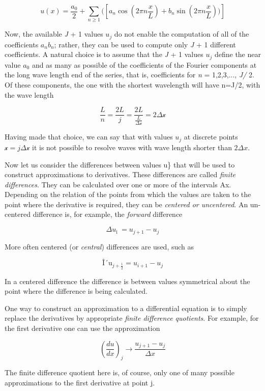 \[u( x ) = \frac{a_{0}}{2} + \sum_{n \geq 1}(\left[  a_{n}  \cos\left(2\pi n \frac{x}{L}\right)
+ b_{n}   \sin\left(2\pi n \frac{x}{L} \right))\right]\]

Now, the available \emph{J} + 1 values \(u_j\) do not enable the
computation of all of the coefficients \(a_{n}b_{n}\); rather, they can
be used to compute only \emph{J} + 1 different coefficients. A natural
choice is to assume that the \emph{J} + 1 values \(u_j\) define the near
value \(a_{0}\) and as many as possible of the coefficients of the
Fourier components at the long wave length end of the series, that is,
coefficients for \emph{n} = 1,2,3,..., \emph{J/} 2. Of these components,
the one with the shortest wavelength will have n=J/2, with the wave
length

\[\frac{L}{n} =  \frac{2L}{j} =  \frac{2L}{\frac{L}{\Delta\mathcal{x}}} = 2\Delta\mathcal{x}\]

Having made that choice, we can say that with values \(u_{j}\) at
discrete points \(\mathcal{x =}j\Delta\mathcal{x}\) it is not possible
to resolve waves with wave length shorter than $2 \Delta x$.

Now let us consider the differences between values u\} that will be used
to construct approximations to derivatives. These differences are
called \emph{finite differences}. They can be calculated over one or
more of the intervals Ax. Depending on the relation of the points from
which the values are taken to the point where the derivative is
required, they can be \emph{centered or uncentered}. An un-centered
difference is, for example, the \emph{forward} difference

\[\Delta u_{\text{i }} = u_{j + 1}  - u_{j}\]

More often centered (or \emph{central}) differences are used, such as

\[\text{Î´u}_{j + \frac{1}{2}} =  u_{i + 1} -  u_{j}\]

In a centered difference the difference is between values symmetrical
about the point where the difference is being calculated.

One way to construct an approximation to a differential equation is to
simply replace the derivatives by appropriate \emph{finite difference
quotients}. For example, for the first derivative one can use the
approximation

    {\[\left( \frac{d u}{d x } \right)_j \to \frac{u_{j + 1} - u_{j}}{\Delta x}\]}

The finite difference quotient here is, of course, only one of many
possible approximations to the first derivative at point j.

